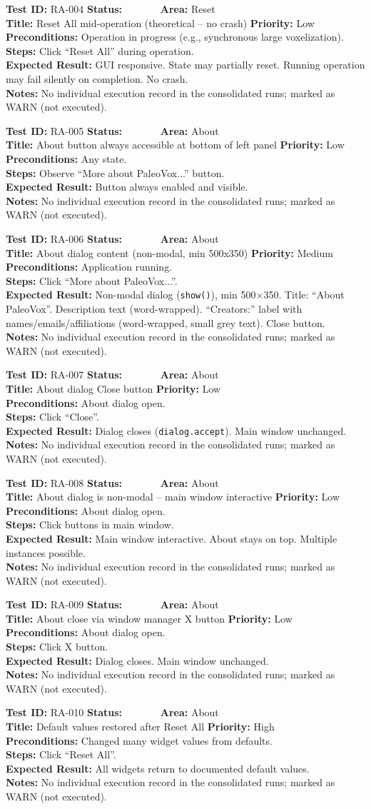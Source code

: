\documentclass[12pt,a4paper]{article}
\newcommand{\statuspass}{\colorbox{statusgreen}{\textcolor{white}{\textbf{\,PASS\,}}}}
\newcommand{\testcase}[9]{%
  \smallskip
  \noindent\textbf{Test ID:} #1 \hfill \textbf{Status:} #2 \hfill \textbf{Area:} #3 \\
  \textbf{Title:} #4 \hfill \textbf{Priority:} #5 \\[0.3em]
  \textbf{Preconditions:} #6 \\[0.3em]
  \textbf{Steps:} #7 \\[0.3em]
  \textbf{Expected Result:} #8 \\
  \textbf{Notes:} #9
  \smallskip
}
\begin{document}
\testcase{RA-004}{\statuspass}{Reset}{Reset All mid-operation (theoretical -- no crash)}{Low}{Operation in progress (e.g., synchronous large voxelization).}{Click ``Reset All'' during operation.}{GUI responsive. State may partially reset. Running operation may fail silently on completion. No crash.}{No individual execution record in the consolidated runs; marked as WARN (not executed).}


\testcase{RA-005}{\statuspass}{About}{About button always accessible at bottom of left panel}{Low}{Any state.}{Observe ``More about PaleoVox...'' button.}{Button always enabled and visible.}{No individual execution record in the consolidated runs; marked as WARN (not executed).}


\testcase{RA-006}{\statuspass}{About}{About dialog content (non-modal, min 500x350)}{Medium}{Application running.}{Click ``More about PaleoVox...''.}{Non-modal dialog (\texttt{show()}), min 500$\times$350. Title: ``About PaleoVox''. Description text (word-wrapped). ``Creators:'' label with names/emails/affiliations (word-wrapped, small grey text). Close button.}{No individual execution record in the consolidated runs; marked as WARN (not executed).}


\testcase{RA-007}{\statuspass}{About}{About dialog Close button}{Low}{About dialog open.}{Click ``Close''.}{Dialog closes (\texttt{dialog.accept}). Main window unchanged.}{No individual execution record in the consolidated runs; marked as WARN (not executed).}


\testcase{RA-008}{\statuspass}{About}{About dialog is non-modal -- main window interactive}{Low}{About dialog open.}{Click buttons in main window.}{Main window interactive. About stays on top. Multiple instances possible.}{No individual execution record in the consolidated runs; marked as WARN (not executed).}


\testcase{RA-009}{\statuspass}{About}{About close via window manager X button}{Low}{About dialog open.}{Click X button.}{Dialog closes. Main window unchanged.}{No individual execution record in the consolidated runs; marked as WARN (not executed).}


\testcase{RA-010}{\statuspass}{About}{Default values restored after Reset All}{High}{Changed many widget values from defaults.}{Click ``Reset All''.}{All widgets return to documented default values.}{No individual execution record in the consolidated runs; marked as WARN (not executed).}



\end{document}
